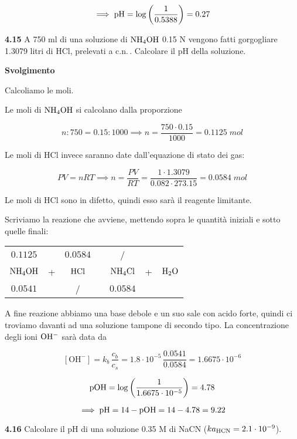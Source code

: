 $$\implies \rm pH=\log{\left(\frac{1}{0.5388}\right)}=0.27$$

\vspace{0.2cm}\textbf{4.15} A 750 ml di una soluzione di $\rm NH_4OH$ 0.15 N vengono fatti gorgogliare 1.3079 litri di HCl, prelevati a c.n.\,. Calcolare il pH della soluzione.

\vspace{0.2cm}\large\textbf{Svolgimento}\normalsize

\vspace{0.2cm}Calcoliamo le moli.

Le moli di $\rm NH_4OH$ si calcolano dalla proporzione

$$n:750=0.15:1000
\implies
n=\frac{750 \cdot 0.15}{1000}=0.1125\;mol$$

Le moli di HCl invece saranno date dall'equazione di stato dei gas:

$$PV=nRT \implies n=\frac{PV}{RT}
=\frac{1 \cdot 1.3079}{0.082 \cdot 273.15}=0.0584\;mol$$

Le moli di HCl sono in difetto, quindi esso sarà il reagente limitante.

Scriviamo la reazione che avviene, mettendo sopra le quantità iniziali e sotto quelle finali:

\begin{center}
    \begin{tabular}{ccccccc}
        $0.1125$ &  & $0.0584$ & & / &&\\
        $\rm NH_4OH$ & + & $\rm HCl$ & \ce{->} & $\rm NH_4Cl$ & + & $\rm H_2O$\\
        $0.0541$ &  & / & & $0.0584$ &&\\
    \end{tabular}
\end{center}

A fine reazione abbiamo una base debole e un suo sale con acido forte, quindi ci troviamo davanti ad una soluzione tampone di secondo tipo. La concentrazione degli ioni $\rm OH^-$ sarà data da

$$[\text{OH}^-]=k_b\,\frac{c_b}{c_s}
=1.8 \cdot 10^{-5}\,\frac{0.0541}{0.0584}
=1.6675 \cdot 10^{-6}$$

$$\rm pOH=\log \left( \frac{1}{1.6675 \cdot 10^{-5}} \right)=4.78$$

$$\implies \rm pH=14-pOH=14-4.78=9.22$$

\vspace{0.2cm}\textbf{4.16} Calcolare il pH di una soluzione 0.35 M di NaCN ($k{a_{\rm HCN}} = 2.1 \cdot 10^{-9}$).

